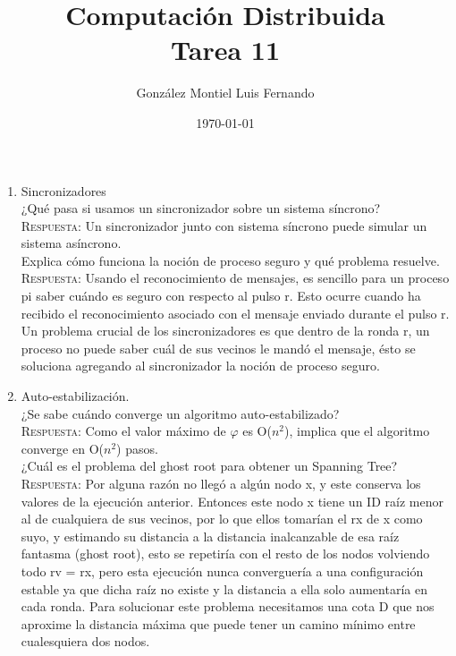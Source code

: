 \documentclass[letterpaper,10pt]{article}
\title{Computación Distribuida \\ Tarea 11}
\author{González Montiel Luis Fernando \\}
\date{\today}
\begin{document}
\maketitle

	\begin{enumerate}

	
    \item Sincronizadores\\
    
    ¿Qué pasa si usamos un sincronizador sobre un sistema síncrono? \\
    \textsc{Respuesta:}
    Un sincronizador junto con sistema síncrono puede simular un sistema asíncrono.    \\
	
	Explica cómo funciona la noción de proceso seguro y qué problema resuelve. \\
	\textsc{Respuesta:}
   Usando el reconocimiento de mensajes, es sencillo para un proceso pi saber cuándo es seguro con respecto al pulso r. Esto ocurre cuando ha recibido el reconocimiento asociado con el mensaje enviado durante el pulso r.
Un problema crucial de los sincronizadores es que dentro de la ronda r, un proceso no puede saber cuál de sus vecinos le mandó el mensaje, ésto se soluciona agregando al sincronizador la noción de proceso seguro.\\    

    \item Auto-estabilización.\\
	
	¿Se sabe cuándo converge un algoritmo auto-estabilizado?\\
    \textsc{Respuesta:}
    Como el valor máximo de $\varphi$ es O($n^{2}$), implica que el algoritmo converge en O($n^{2}$) pasos. \\
    
	¿Cuál es el problema del ghost root para obtener un Spanning Tree?\\
	\textsc{Respuesta:}
    Por alguna razón no llegó a algún nodo x, y este conserva los valores de la ejecución anterior. Entonces este nodo x tiene un ID raíz menor al de cualquiera de sus vecinos, por lo que ellos tomarían el rx de x como suyo, y estimando su distancia a la distancia inalcanzable de esa raíz fantasma (ghost root), esto se repetiría con el resto de los nodos volviendo todo rv = rx, pero esta ejecución nunca converguería a una configuración estable ya que dicha raíz no existe y la distancia a ella solo aumentaría en cada ronda.
Para solucionar este problema necesitamos una cota D que nos aproxime la
distancia máxima que puede tener un camino mínimo entre cualesquiera dos nodos.\\
    

\end{enumerate}
\end{document}
